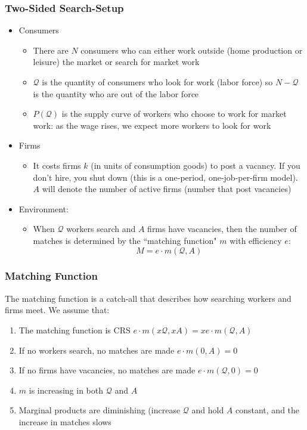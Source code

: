 \documentclass{beamer}
\begin{document}
\begin{frame}
\frametitle[alignment=center]{Two-Sided Search-Setup}
\begin{itemize}
\item Consumers
\begin{itemize}
\item There are $N$ consumers who can either work outside (home production or leisure) the market or search for market work
\bigskip
\item $\mathcal{Q}$ is the quantity of consumers who look for work (labor force) so $N-\mathcal{Q}$ is the quantity who are out of the labor force
\bigskip
\item $P(\mathcal{Q})$ is the supply curve of workers who choose to work for market work: as the wage rises, we expect more workers to look for work
\end{itemize}  
\item Firms
\begin{itemize}
\item It costs firms $k$ (in units of consumption goods) to post a vacancy.  If you don't hire, you shut down (this is a one-period, one-job-per-firm model).  $A$ will denote the number of active firms (number that post vacancies)
\end{itemize}  
\item Environment:
\begin{itemize}
\item When $\mathcal{Q}$ workers search and $A$ firms have vacancies, then the number of matches is determined by the ``matching function" $m$ with efficiency $e$:
$$M=e\cdot m(\mathcal{Q},A)$$
\end{itemize}
\end{itemize}
\end{frame}

\begin{frame}
\frametitle[alignment=center]{Matching Function}
 The matching function is a catch-all that describes how searching workers and firms meet.  We assume that:
 \bigskip
 \begin{enumerate}
\item The matching function is CRS $e\cdot m(x\mathcal{Q},xA)=xe\cdot m(\mathcal{Q},A)$
 \bigskip
\item If no workers search, no matches are made $e\cdot m(0,A)=0$
 \bigskip
\item If no firms have vacancies, no matches are made $e\cdot m(\mathcal{Q},0)=0$
 \bigskip
\item $m$ is increasing in both $\mathcal{Q}$ and $A$
 \bigskip
\item Marginal products are diminishing (increase $\mathcal{Q}$ and hold $A$ constant, and the increase in matches slows
\end{enumerate}
\end{frame}
\end{document}
